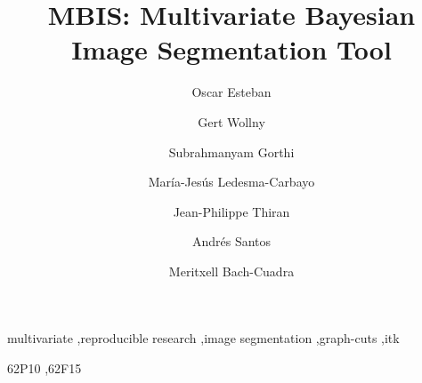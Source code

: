 \documentclass[final,3p,times,twocolumn]{elsarticle}
\begin{document}
\begin{frontmatter}



\title{MBIS: Multivariate Bayesian Image Segmentation Tool}


\author[bit,lts5,ciber]{Oscar Esteban}

\author[bit,ciber]{Gert Wollny}
\author[lts5]{Subrahmanyam Gorthi}
\author[bit,ciber]{Mar\'ia-Jes\'us Ledesma-Carbayo}
\author[lts5,chuv]{Jean-Philippe Thiran}
\author[bit,ciber]{Andr\'es Santos}
\author[chuv,lts5]{Meritxell Bach-Cuadra}



\address[bit]{Biomedical Image Technologies (BIT), ETSI Telecomunicaci\'on, Universidad Polit\'ecnica de Madrid, Spain}
\address[lts5]{Signal Processing Laboratory (LTS5), \'Ecole Polytechnique F\'ed\'erale de Lausanne (EPFL), Switzerland}
\address[chuv]{Department of Radiology, Centre d'Imaginerie Biom\'edicale, University Hospital Center and University of Lausanne, Switzerland}
\address[ciber]{Biomedical Research Networking Center in Bioengineering, Biomaterials and Nanomedicine (CIBER-BBN), Spain}




\begin{abstract}
\label{sec:abstract}

\end{abstract}

\begin{keyword}
multivariate \sep reproducible research \sep image segmentation 
\sep graph-cuts \sep \acrshort*{itk}

\MSC[2010] 62P10 \sep 62F15
\end{keyword}

\end{frontmatter}
\end{document}

